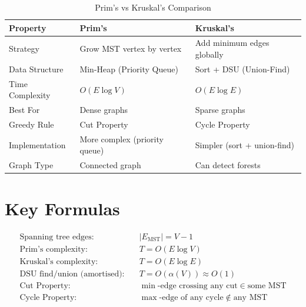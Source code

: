 \documentclass[12pt,a4paper]{article}
\begin{document}
\begin{table}[h!]
\centering
\renewcommand{\arraystretch}{1.5}
\begin{tabular}{|l|p{5.5cm}|p{5.5cm}|}
\hline
\textbf{Property}      & \textbf{Prim's}                    & \textbf{Kruskal's}                \\
\hline
Strategy               & Grow MST vertex by vertex           & Add minimum edges globally        \\
Data Structure         & Min-Heap (Priority Queue)           & Sort + DSU (Union-Find)           \\
Time Complexity        & $O(E \log V)$                      & $O(E \log E)$                     \\
Best For               & Dense graphs                        & Sparse graphs                     \\
Greedy Rule            & Cut Property                        & Cycle Property                    \\
Implementation         & More complex (priority queue)       & Simpler (sort + union-find)       \\
Graph Type             & Connected graph                     & Can detect forests                \\
\hline
\end{tabular}
\caption{Prim's vs Kruskal's Comparison}
\end{table}

\section{Key Formulas}

\begin{align}
\text{Spanning tree edges:}\quad      & |E_{\text{MST}}| = V - 1 \\
\text{Prim's complexity:}\quad        & T = O(E \log V) \\
\text{Kruskal's complexity:}\quad     & T = O(E \log E) \\
\text{DSU find/union (amortised):}\quad & T = O(\alpha(V)) \approx O(1) \\
\text{Cut Property:}\quad             & \min\text{-edge crossing any cut} \in \text{some MST} \\
\text{Cycle Property:}\quad           & \max\text{-edge of any cycle} \notin \text{any MST}
\end{align}
\end{document}
